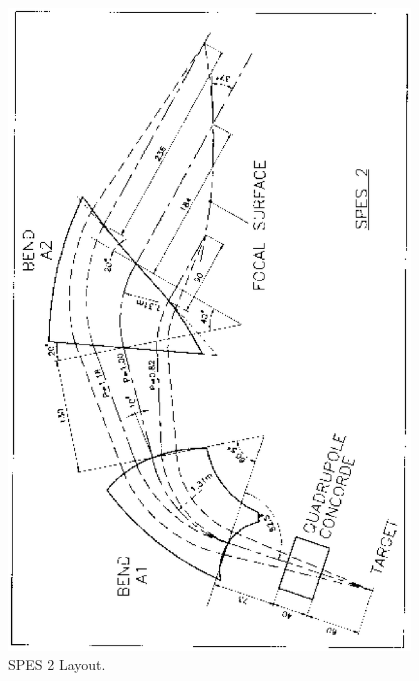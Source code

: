 \begin{figure}[H]
\centerline{\includegraphics[height=17cm,angle=-90]{FigC1-1.eps}}
\caption{\label{figC11}SPES 2 Layout.}
\end{figure}

\vfill 


